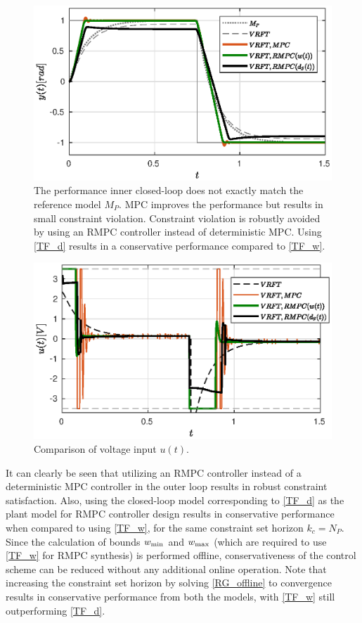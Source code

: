 \documentclass[letterpaper, 10 pt, conference]{ieeeconf}  %
\begin{document}
	\begin{figure}[t]
		\hspace{20pt}
		\includegraphics[scale = 0.50]{VRFT_vs_MPC.eps}
		\caption{The performance inner closed-loop does not exactly match the reference model $M_P$. MPC improves the performance but results in small constraint violation. Constraint violation is robustly avoided by using an RMPC controller instead of deterministic MPC. Using \eqref{TF_d} results in a conservative performance compared to \eqref{TF_w}.  }
		\label{VRFT_y}
	\end{figure} 
	\begin{figure}[t]
		\hspace{20pt}
		\includegraphics[scale = 0.50]{VRFT_vs_MPC_u.eps}
		\caption{Comparison of voltage input $u(t)$.}
		\label{VRFT_u}
	\end{figure} 
	It can clearly be seen that utilizing an RMPC controller instead of a deterministic MPC controller in the outer loop results in robust constraint satisfaction. Also, using the closed-loop model corresponding to \eqref{TF_d} as the plant model for RMPC controller design results in conservative performance when compared to using \eqref{TF_w}, for the same constraint set horizon $k_c = N_P$. Since the calculation of bounds $w_{\rm min}$ and $w_{\rm max}$ (which are required to use \eqref{TF_w} for RMPC synthesis) is performed offline, conservativeness of the control scheme can be reduced without any additional online operation. Note that increasing the constraint set horizon by solving \eqref{RG_offline} to convergence results in conservative performance from both the models, with \eqref{TF_w} still outperforming \eqref{TF_d}. 
	
\end{document}
